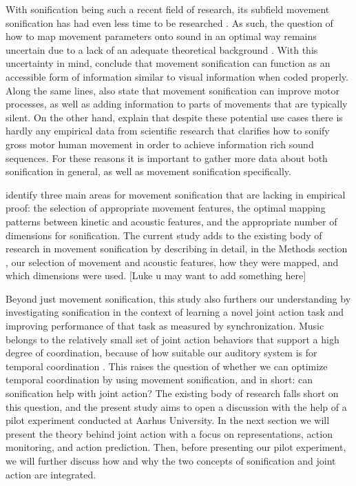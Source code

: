\documentclass[10pt,a4paper,onecolumn]{article}
\begin{document}
With sonification being such a recent field of research, its subfield movement sonification has had even less time to be researched \autocite{vinkenAuditoryCodingHuman2013}. As such, the question of how to map movement parameters onto sound in an optimal way remains uncertain due to a lack of an adequate theoretical background \autocite{effenbergAccelerationDecelerationConstant2018}. With this uncertainty in mind, \textcite{effenbergAccelerationDecelerationConstant2018} conclude that movement sonification can function as an accessible form of information similar to visual information when coded properly. Along the same lines, \textcite{vinkenAuditoryCodingHuman2013} also state that movement sonification can improve motor processes, as well as adding information to parts of movements that are typically silent. On the other hand, \textcite{vinkenAuditoryCodingHuman2013} explain that despite these potential use cases there is hardly any empirical data from scientific research that clarifies how to sonify gross motor human movement in order to achieve information rich sound sequences. For these reasons it is important to gather more data about both sonification in general, as well as movement sonification specifically.

\textcite{vinkenAuditoryCodingHuman2013} identify three main areas for movement sonification that are lacking in empirical proof: the selection of appropriate movement features, the optimal mapping patterns between kinetic and acoustic features, and the appropriate number of dimensions for sonification. The current study adds to the existing body of research in movement sonification by describing in detail, in the Methods section , our selection of movement and acoustic features, how they were mapped, and which dimensions were used. {[}Luke u may want to add something here{]}

Beyond just movement sonification, this study also furthers our understanding by investigating sonification in the context of learning a novel joint action task and improving performance of that task as measured by synchronization. Music belongs to the relatively small set of joint action behaviors that support a high degree of coordination, because of how suitable our auditory system is for temporal coordination \autocite{hildebrandtShortPaperEnhancing2014}. This raises the question of whether we can optimize temporal coordination by using movement sonification, and in short: can sonification help with joint action? The existing body of research falls short on this question, and the present study aims to open a discussion with the help of a pilot experiment conducted at Aarhus University. In the next section we will present the theory behind joint action with a focus on representations, action monitoring, and action prediction. Then, before presenting our pilot experiment, we will further discuss how and why the two concepts of sonification and joint action are integrated.
\end{document}
